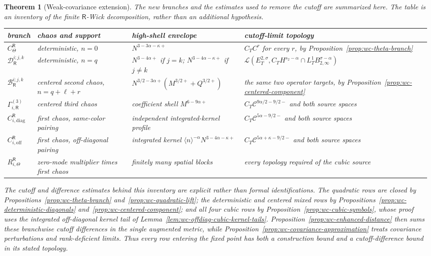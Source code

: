 \documentclass[10pt]{amsart}
\renewcommand{\arraystretch}{1.03}
\numberwithin{equation}{section}
\theoremstyle{plain}
\newtheorem{theorem}{Theorem}[section]
\theoremstyle{definition}
\theoremstyle{remark}
\begin{document}
\begin{theorem}[Weak-covariance extension]
The new branches and the estimates used to remove the cutoff are summarized here.  The table is an inventory of the finite \(\mathsf R\)-Wick decomposition, rather than an additional hypothesis.
\begin{center}
\scriptsize
\renewcommand{\arraystretch}{1.16}
\begin{tabular}{@{}>{\raggedright\arraybackslash}p{}>{\raggedright\arraybackslash}p{}>{\raggedright\arraybackslash}p{}>{\raggedright\arraybackslash}p{}@{}}
\toprule
branch & chaos and support & high-shell envelope & cutoff-limit topology \\
\midrule
$C_\Theta^{\mathsf R}$ & deterministic, $n=0$ & $N^{3-3\alpha-\kappa+}$ & $C_T C^r$ for every $r$, by Proposition~\ref{prop:wc-theta-branch} \\
$\mathcal D_{\mathsf R}^{i;j,k}$ & deterministic, $n=q$ & $N^{3-4\alpha+}$ if $j=k$; $N^{3-4\alpha-\kappa+}$ if $j\ne k$ & $\mathcal L(E_T^{2,\sigma},C_TH^{s_2-\alpha}\cap L_T^1B_{2,\infty}^{\sigma-\alpha})$ \\
$\mathcal B_{\mathsf R}^{i;j,k}$ & centered second chaos, $n=q+\ell+r$ & $N^{3/2-3\alpha+}(M^{3/2+}+Q^{3/2+})$ & the same two operator targets, by Proposition~\ref{prop:wc-centered-component} \\
$\Gamma_{i,\mathsf R}^{(3)}$ & centered third chaos & coefficient shell $M^{6-9\alpha+}$ & $C_T\mathcal C^{9\alpha/2-9/2-}$ and both source spaces \\
$C_{i,\mathrm{diag}}^{\mathsf R}$ & first chaos, same-color pairing & independent integrated-kernel profile & $C_T\mathcal C^{5\alpha-9/2-}$ and both source spaces \\
$C_{i,\mathrm{off}}^{\mathsf R}$ & first chaos, off-diagonal pairing & integrated kernel $\langle n\rangle^{-\alpha}N^{3-4\alpha-\kappa+}$ & $C_T\mathcal C^{5\alpha+\kappa-9/2-}$ and both source spaces \\
$R_{i,\Theta}^{\mathsf R}$ & zero-mode multiplier times first chaos & finitely many spatial blocks & every topology required of the cubic source \\
\bottomrule
\end{tabular}
\end{center}

The cutoff and difference estimates behind this inventory are explicit rather than formal identifications.  The quadratic rows are closed by Propositions~\ref{prop:wc-theta-branch} and~\ref{prop:wc-quadratic-lift}; the deterministic and centered mixed rows by Propositions~\ref{prop:wc-deterministic-diagonals} and~\ref{prop:wc-centered-component}; and all four cubic rows by Proposition~\ref{prop:wc-cubic-symbols}, whose proof uses the integrated off-diagonal kernel tail of Lemma~\ref{lem:wc-offdiag-cubic-kernel-tails}.  Proposition~\ref{prop:wc-enhanced-distance} then sums these branchwise cutoff differences in the single augmented metric, while Proposition~\ref{prop:wc-covariance-approximation} treats covariance perturbations and rank-deficient limits.  Thus every row entering the fixed point has both a construction bound and a cutoff-difference bound in its stated topology.


\end{theorem}
\end{document}
